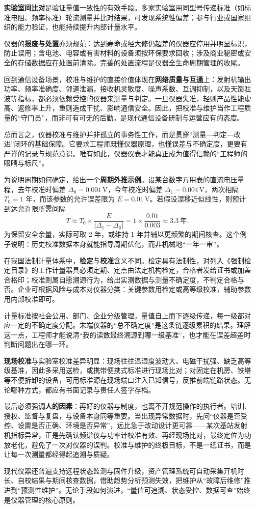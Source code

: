 \textbf{实验室间比对}是验证量值一致性的有效手段。多家实验室用同型号传递标准（如标准电阻、频率标准）轮流测量并比对结果，可发现系统性偏差；参与行业或国家组织的能力验证，也能持续提升内部计量水平。

仪器的\textbf{报废与处置}亦须规范：达到寿命或经大修仍超差的仪器应停用并明显标识，防止误用；含电池、电容或有害材料的设备须按环保要求回收；涉及商业秘密或安全的存储数据应在处置前清除。完善的处置流程是仪器全生命周期管理的收尾。

回到通信设备场景，校准与维护的直接价值体现在\textbf{网络质量与互通}上：发射机输出功率、频率准确度、邻道泄漏，接收机灵敏度、噪声系数、互调抑制，以及天馈驻波等指标，都必须依赖受控的仪器来测量与判定。一旦仪器失准，轻则产品性能虚高、返修率上升，重则造成干扰、影响通信安全。因此，把校准与维护当作工程质量的“守门员”，而非可有可无的后勤，是现代通信设备研制与运营应有的态度。

总而言之，仪器校准与维护并非孤立的事务性工作，而是贯穿“测量—判定—改进”闭环的基础保障。它要求工程师既懂仪器原理，也懂误差与不确定度，更要有严谨的记录与规范意识。唯有如此，仪器仪表才能真正成为值得信赖的“工程师的眼睛与标尺”。

为说明周期如何确定，给出一个\textbf{周期外推示例}。设某台数字万用表的直流电压量程，去年校准时偏差 $\Delta_0=0.001\,\mathrm{V}$，今年校准时偏差 $\Delta_1=0.004\,\mathrm{V}$，两次相隔 $T_0=1$ 年，而该参数的允许误差限为 $E=0.01\,\mathrm{V}$。若假设漂移近似线性，则预计到达允许限所需间隔
\[
    T \approx T_0 \times \frac{E}{|\Delta_1-\Delta_0|} = 1\times\frac{0.01}{0.003} \approx 3.3\ \text{年}.
\]
为保留安全余量，实际可取 2 年，或维持 1 年并辅以更频繁的期间核查。这个例子说明：历史校准数据本身就能指导周期优化，而非机械地“一年一审”。

在我国法制计量体系中，\textbf{检定}与\textbf{校准}含义不同。检定具有法制性，对列入《强制检定目录》的工作计量器具必须定期、定点由法定机构检定，合格者发给证书或加盖合格印；校准则属自愿溯源行为，给出实测数据与测量不确定度，不判定合格与否。企业可根据风险与成本对仪器分类：关键参数用检定或高等级校准，辅助参数用内部校准即可。

计量标准按社会公用、部门、企业分级管理，量值自上而下逐级传递，每一级都对应一定的不确定度分配。末端仪器的“总不确定度”是这条链逐级累积的结果。理解这一点，工程师才能说清“我的读数最终溯源到哪一级基准”，也才能在误差超差时判断问题出在哪一环。

\textbf{现场校准}与实验室校准差异明显：现场往往温湿度波动大、电磁干扰强、缺乏高等级基准，因此多采用送检，或携带便携式标准进行现场比对；对固定在机房、铁塔等不便拆卸的设备，可用标准源在现场端口注入已知信号，反推前端链路状态。无论哪种方式，都应有书面记录与责任人签字存档。

最后必须强调\textbf{人的因素}：再好的仪器与制度，也离不开规范操作的执行者。培训、授权、监督与复盘，与设备本身同等重要。当出现异常数据时，先问“仪器是否受控、设置是否正确、环境是否异常”，远比急于改动设计更可靠——某次基站发射机指标异常，正是先确认频谱仪与功率计校准有效、再经现场比对，最终定位为功放老化，避免了一次对仪器的误判。校准与维护的终极目标，不是一纸证书，而是让每一次测量都经得起追溯与质疑。

现代仪器还普遍支持远程状态监测与固件升级，资产管理系统可自动采集开机时长、自校结果与期间核查数据，借助趋势分析预测失效，把维护从“故障后维修”推进到“预测性维护”。无论手段如何演进，“量值可追溯、状态受控、数据可查”始终是仪器管理的核心原则。
